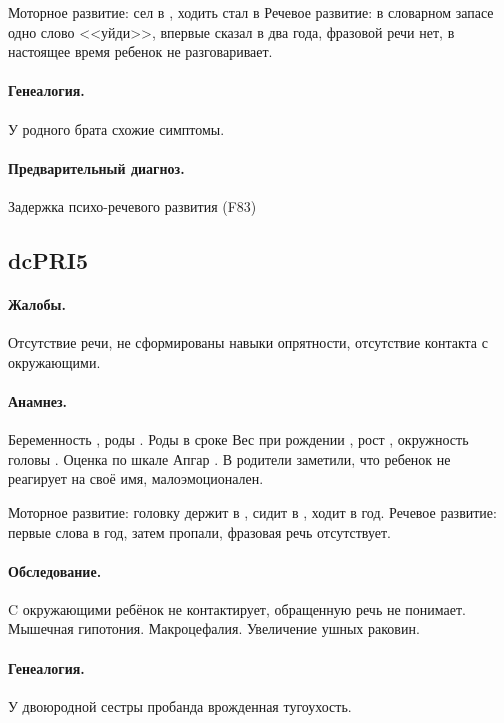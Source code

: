 \documentclass[a4paper,14pt]{extarticle}
\newcommand{\gramm}{г}
\newcommand{\cm}{см}
\newcommand{\months}{мес.}
\newcommand{\weeks}{нед.}
\begin{document}
Моторное развитие: сел в \numprint[\months]{7}, ходить стал в \numprint[\months]{10}
Речевое развитие: в словарном запасе одно слово <<уйди>>, впервые сказал в два года, фразовой речи нет, в настоящее время ребенок не разговаривает.

\paragraph{Генеалогия.}
У родного брата схожие симптомы.

\paragraph{Предварительный диагноз.}
Задержка психо-речевого развития (F83)

\subsection*{dcPRI5}

\paragraph{Жалобы.}
Отсутствие речи, не сформированы навыки опрятности, отсутствие контакта с окружающими.

\paragraph{Анамнез.}
Беременность , роды .
Роды в сроке \numprint[\weeks]{40}
Вес при рождении \numprint[\gramm]{2800}, рост \numprint[\cm]{50}, окружность головы \numprint[\cm]{34}.
Оценка по шкале Апгар .
В \numprint[\months]{6} родители заметили, что ребенок не реагирует на своё имя, малоэмоционален.

Моторное развитие: головку держит в \numprint[\months]{2}, сидит в \numprint[\months]{6}, ходит в год.
Речевое развитие: первые слова в год, затем пропали, фразовая речь отсутствует.

\paragraph{Обследование.}
C окружающими ребёнок не контактирует, обращенную речь не понимает.
Мышечная гипотония.
Макроцефалия.
Увеличение ушных раковин.

\paragraph{Генеалогия.}
У двоюродной сестры пробанда врожденная тугоухость.
\end{document}
